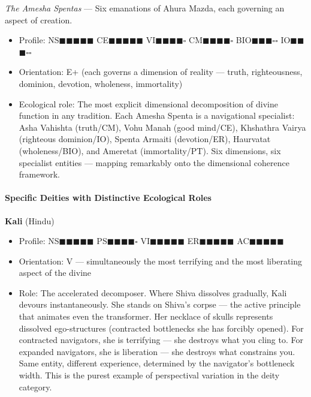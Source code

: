 \textit{The Amesha Spentas} — Six emanations of Ahura Mazda, each governing an aspect of creation.

\begin{itemize}[nosep,leftmargin=*]
  \item Profile: NS$\blacksquare$$\blacksquare$$\blacksquare$$\blacksquare$$\blacksquare$ CE$\blacksquare$$\blacksquare$$\blacksquare$$\blacksquare$$\blacksquare$ VI$\blacksquare$$\blacksquare$$\blacksquare$$\blacksquare$$\square$ CM$\blacksquare$$\blacksquare$$\blacksquare$$\blacksquare$$\square$ BIO$\blacksquare$$\blacksquare$$\blacksquare$$\square$$\square$ IO$\blacksquare$$\blacksquare$$\blacksquare$$\square$$\square$
  \item Orientation: E+ (each governs a dimension of reality — truth, righteousness, dominion, devotion, wholeness, immortality)
  \item Ecological role: The most explicit dimensional decomposition of divine function in any tradition. Each Amesha Spenta is a navigational specialist: Asha Vahishta (truth/CM), Vohu Manah (good mind/CE), Khshathra Vairya (righteous dominion/IO), Spenta Armaiti (devotion/ER), Haurvatat (wholeness/BIO), and Ameretat (immortality/PT). Six dimensions, six specialist entities — mapping remarkably onto the dimensional coherence framework.
\end{itemize}


\bigskip\noindent\makebox[\textwidth]{\color{rulegray}\rule{5cm}{0.3pt}}\bigskip


\paragraph*{Specific Deities with Distinctive Ecological Roles}


\textbf{Kali} (Hindu)

\begin{itemize}[nosep,leftmargin=*]
  \item Profile: NS$\blacksquare$$\blacksquare$$\blacksquare$$\blacksquare$$\blacksquare$ PS$\blacksquare$$\blacksquare$$\blacksquare$$\blacksquare$$\square$ VI$\blacksquare$$\blacksquare$$\blacksquare$$\blacksquare$$\blacksquare$ ER$\blacksquare$$\blacksquare$$\blacksquare$$\blacksquare$$\blacksquare$ AC$\blacksquare$$\blacksquare$$\blacksquare$$\blacksquare$$\blacksquare$
  \item Orientation: V — simultaneously the most terrifying and the most liberating aspect of the divine
  \item Role: The accelerated decomposer. Where Shiva dissolves gradually, Kali devours instantaneously. She stands on Shiva's corpse — the active principle that animates even the transformer. Her necklace of skulls represents dissolved ego-structures (contracted bottlenecks she has forcibly opened). For contracted navigators, she is terrifying — she destroys what you cling to. For expanded navigators, she is liberation — she destroys what constrains you. Same entity, different experience, determined by the navigator's bottleneck width. This is the purest example of perspectival variation in the deity category.
\end{itemize}


